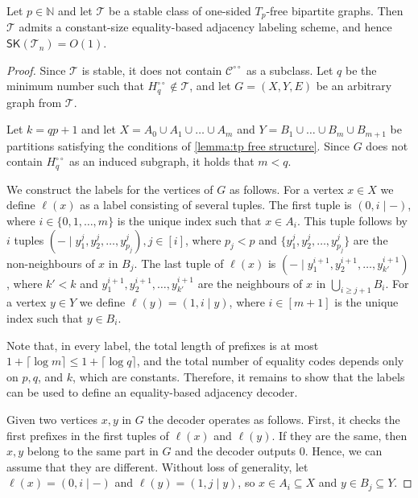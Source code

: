 \documentclass{article}
\newcommand{\ceil}[1]{\ensuremath{\lceil #1 \rceil}}
\newcommand\eqLabelSep{\mathbin|}
\newcommand{\cC}{\ensuremath{\mathcal{C}}}
\newcommand{\cT}{\ensuremath{\mathcal{T}}}
\newcommand{\RL}{\mathsf{SK}}
\newcommand{\dcirc}{{\circ\circ}}
\begin{document}
\begin{lemma}
\label{lemma:tp free labeling}
Let $p \in \mathbb{N}$ and let $\cT$ be a stable class of one-sided $T_{p}$-free bipartite graphs.
Then $\cT$ admits a constant-size equality-based adjacency labeling scheme, and hence 
$\RL(\cT_n) = O(1)$.
%
\end{lemma}
\begin{proof}
	Since $\cT$ is stable, it does not contain $\cC^\dcirc$ as a subclass.
	Let $q$ be the minimum number such that $H^{\circ\circ}_q \not\in \cT$,
	and let $G=(X,Y,E)$ be an arbitrary graph from $\cT$.
	
	Let $k = qp+1$ and let $X =A_0 \cup  A_1 \cup \ldots \cup A_m$ and $Y = B_1 \cup \ldots \cup B_m \cup B_{m+1}$ be partitions satisfying the conditions of \cref{lemma:tp free structure}.
	Since $G$ does not contain $H^{\circ\circ}_q$ as an induced subgraph, it holds that $m < q$.
	
	We construct the labels for the vertices of $G$ as follows. 
	For a vertex $x \in X$ we define $\ell(x)$ as a label consisting of several tuples. The first tuple is
	$(0, i \eqLabelSep -)$, where $i \in \{ 0, 1, \ldots, m \}$ is the unique index such that $x \in A_i$.
	This tuple follows by $i$ tuples $(- \eqLabelSep y^j_1, y^j_2, \ldots, y^j_{p_j}), j \in [i]$, where
	$p_j < p$ and $\{y^j_1, y^j_2, \ldots, y^j_{p_j}\}$ are the non-neighbours of $x$ in $B_j$.
	The last tuple of $\ell(x)$ is $(- \eqLabelSep y^{i+1}_1, y^{i+1}_2, \ldots, y^{i+1}_{k'})$, where $k' < k$
	and $y^{i+1}_1, y^{i+1}_2, \ldots, y^{i+1}_{k'}$ are the neighbours of $x$ in $\bigcup_{i \geq j+1} B_i$.
	For a vertex $y \in Y$ we define $\ell(y) = ( 1, i \eqLabelSep y)$, where $i \in [m+1]$ is the unique index such that $y \in B_i$.
	
	Note that, in every label, the total length of prefixes is at most $1 + \ceil{\log m} \leq 1 + \ceil{\log q}$, and
	the total number of equality codes depends only on $p,q$, and $k$, which are constants.
	Therefore, it remains to show that the labels can be used to define an equality-based adjacency decoder.
		
	Given two vertices $x,y$ in $G$ the decoder operates as follows. 
	First, it checks the first prefixes in the first tuples of $\ell(x)$ and $\ell(y)$.
	If they are the same, then $x,y$ belong to the same part in $G$ and the decoder outputs 0.
	Hence, we can assume that they are different. Without loss of generality, let
	$\ell(x) = (0, i \eqLabelSep -)$ and $\ell(y) = ( 1, j \eqLabelSep y)$, so $x \in A_i \subseteq X$ and $y \in B_j \subseteq Y$.
	

\end{proof}
\end{document}
